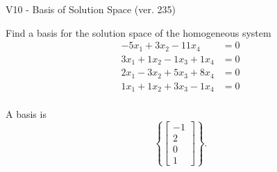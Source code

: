 \begin{exercise}
  \begin{exerciseTitle}V10 - Basis of Solution Space (ver. 235)\end{exerciseTitle}
  \begin{exerciseStatement}
    Find a basis for the solution space of the homogeneous system 
\begin{align*}
 -5 x_ 1 + 3 x_ 2 -11 x_ 4 &= 0  \\ 
  3 x_ 1 + 1 x_ 2 -1 x_ 3 + 1 x_ 4 &= 0  \\ 
  2 x_ 1 -3 x_ 2 + 5 x_ 3 + 8 x_ 4 &= 0  \\ 
  1 x_ 1 + 1 x_ 2 + 3 x_ 3 -1 x_ 4 &= 0  \\ 
 \end{align*}


 
  \end{exerciseStatement}

  \begin{exerciseAnswer}
   A basis is   
\[\left\{\left[\begin{array}{c}
-1 \\
2 \\
0 \\
1
\end{array}\right]\right\}.\]

  


  \end{exerciseAnswer}
\end{exercise}